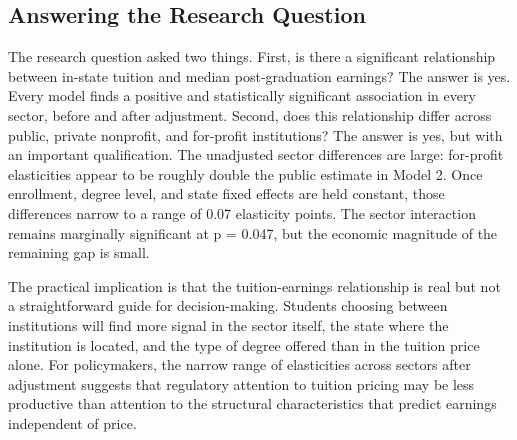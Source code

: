 \subsection{Answering the Research Question}

The research question asked two things. First, is there a significant relationship between in-state tuition and median post-graduation earnings? The answer is yes. Every model finds a positive and statistically significant association in every sector, before and after adjustment. Second, does this relationship differ across public, private nonprofit, and for-profit institutions? The answer is yes, but with an important qualification. The unadjusted sector differences are large: for-profit elasticities appear to be roughly double the public estimate in Model 2. Once enrollment, degree level, and state fixed effects are held constant, those differences narrow to a range of 0.07 elasticity points. The sector interaction remains marginally significant at p = 0.047, but the economic magnitude of the remaining gap is small.

The practical implication is that the tuition-earnings relationship is real but not a straightforward guide for decision-making. Students choosing between institutions will find more signal in the sector itself, the state where the institution is located, and the type of degree offered than in the tuition price alone. For policymakers, the narrow range of elasticities across sectors after adjustment suggests that regulatory attention to tuition pricing may be less productive than attention to the structural characteristics that predict earnings independent of price.
